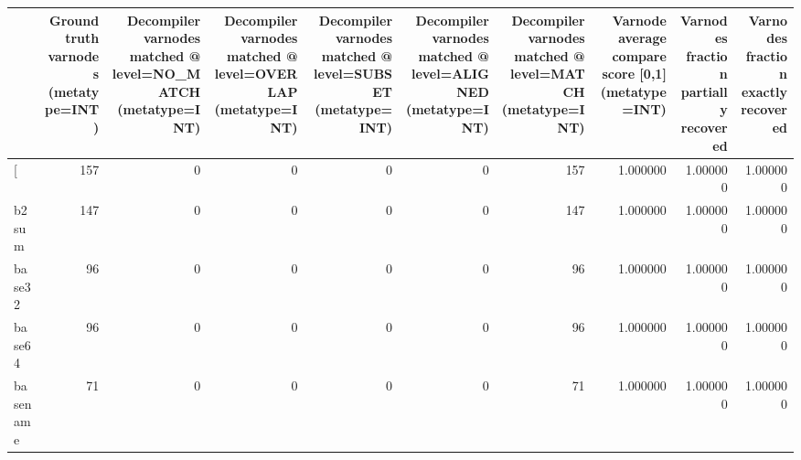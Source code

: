 \begin{tabular}{lrrrrrrrrr}
\toprule
{} &  Ground truth varnodes (metatype=INT) &  Decompiler varnodes matched @ level=NO\_MATCH (metatype=INT) &  Decompiler varnodes matched @ level=OVERLAP (metatype=INT) &  Decompiler varnodes matched @ level=SUBSET (metatype=INT) &  Decompiler varnodes matched @ level=ALIGNED (metatype=INT) &  Decompiler varnodes matched @ level=MATCH (metatype=INT) &  Varnode average compare score [0,1] (metatype=INT) &  Varnodes fraction partially recovered &  Varnodes fraction exactly recovered \\
\midrule
[         &                                   157 &                                                  0 &                                                  0 &                                                  0 &                                                  0 &                                                157 &                                           1.000000 &                               1.000000 &                             1.000000 \\
b2sum     &                                   147 &                                                  0 &                                                  0 &                                                  0 &                                                  0 &                                                147 &                                           1.000000 &                               1.000000 &                             1.000000 \\
base32    &                                    96 &                                                  0 &                                                  0 &                                                  0 &                                                  0 &                                                 96 &                                           1.000000 &                               1.000000 &                             1.000000 \\
base64    &                                    96 &                                                  0 &                                                  0 &                                                  0 &                                                  0 &                                                 96 &                                           1.000000 &                               1.000000 &                             1.000000 \\
basename  &                                    71 &                                                  0 &                                                  0 &                                                  0 &                                                  0 &                                                 71 &                                           1.000000 &                               1.000000 &                             1.000000 \\

\end{tabular}
